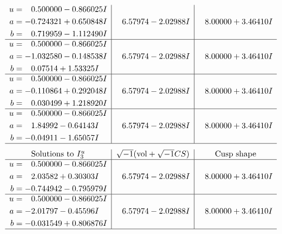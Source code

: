 \documentclass[1p]{elsarticle_modified}
\theoremstyle{definition}
\newcommand{\I}{\sqrt{-1}}
\begin{document}
$$\begin{array}{c|c|c}
\begin{aligned}
u &= \phantom{-}0.500000 - 0.866025 I \\
a &= -0.724321 + 0.650848 I \\
b &= \phantom{-}0.719959 - 1.112490 I\end{aligned}
 & \phantom{-}6.57974 - 2.02988 I & \phantom{-}8.00000 + 3.46410 I \\ \hline\begin{aligned}
u &= \phantom{-}0.500000 - 0.866025 I \\
a &= -1.032580 - 0.148538 I \\
b &= \phantom{-}0.07514 + 1.53325 I\end{aligned}
 & \phantom{-}6.57974 - 2.02988 I & \phantom{-}8.00000 + 3.46410 I \\ \hline\begin{aligned}
u &= \phantom{-}0.500000 - 0.866025 I \\
a &= -0.110864 + 0.292048 I \\
b &= \phantom{-}0.030499 + 1.218920 I\end{aligned}
 & \phantom{-}6.57974 - 2.02988 I & \phantom{-}8.00000 + 3.46410 I \\ \hline\begin{aligned}
u &= \phantom{-}0.500000 - 0.866025 I \\
a &= \phantom{-}1.84992 - 0.64143 I \\
b &= -0.04911 - 1.65057 I\end{aligned}
 & \phantom{-}6.57974 - 2.02988 I & \phantom{-}8.00000 + 3.46410 I\\
 \hline 
 \end{array}$$\newpage$$\begin{array}{c|c|c}  
\text{Solutions to }I^u_{3}& \I (\text{vol} + \sqrt{-1}CS) & \text{Cusp shape}\\
 \hline 
\begin{aligned}
u &= \phantom{-}0.500000 - 0.866025 I \\
a &= \phantom{-}2.03582 + 0.30303 I \\
b &= -0.744942 - 0.795979 I\end{aligned}
 & \phantom{-}6.57974 - 2.02988 I & \phantom{-}8.00000 + 3.46410 I \\ \hline\begin{aligned}
u &= \phantom{-}0.500000 - 0.866025 I \\
a &= -2.01797 - 0.45596 I \\
b &= -0.031549 + 0.806876 I\end{aligned}
 & \phantom{-}6.57974 - 2.02988 I & \phantom{-}8.00000 + 3.46410 I\\
 \hline 
 \end{array}$$\newpage
\end{document}
